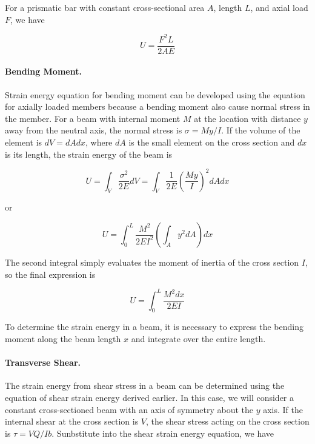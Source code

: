 \documentclass[
10pt,
a4paper,
openany,
svgnames,
]{kaobook} %
\begin{document}
For a prismatic bar with constant cross-sectional area $A$, length $L$, and axial load $F$, we have

\begin{equation}
  U = \frac{F^2L}{2AE}
\end{equation}

\paragraph{Bending Moment.}

Strain energy equation for bending moment can be developed using the equation for axially loaded members because a bending moment also cause normal stress in the member. For a beam with internal moment $M$ at the location with distance $y$ away from the neutral axis, the normal stress is $\sigma = My/I$. If the volume of the element is $dV = dA dx$, where $dA$ is the small element on the cross section and $dx$ is its length, the strain energy of the beam is

\begin{equation*}
  U = \int_V \frac{\sigma^2}{2E} dV = \int_V \frac{1}{2E} \left( \frac{My}{I} \right)^2 dA dx
\end{equation*}

or

\begin{equation*}
  U = \int_0^L \frac{M^2}{2EI^2} \left( \int_A y^2 dA \right) dx
\end{equation*}

The second integral simply evaluates the moment of inertia of the cross section $I$, so the final expression is

\begin{equation}
  U = \int_0^L \frac{M^2dx}{2EI}
\end{equation}

To determine the strain energy in a beam, it is necessary to express the bending moment along the beam length $x$ and integrate over the entire length.

\paragraph{Transverse Shear.}

The strain energy from shear stress in a beam can be determined using the equation of shear strain energy derived earlier. In this case, we will consider a constant cross-sectioned beam with an axis of symmetry about the $y$ axis. If the internal shear at the cross section is $V$, the shear stress acting on the cross section is $\tau = VQ/Ib$. Sunbstitute into the shear strain energy equation, we have
\end{document}
